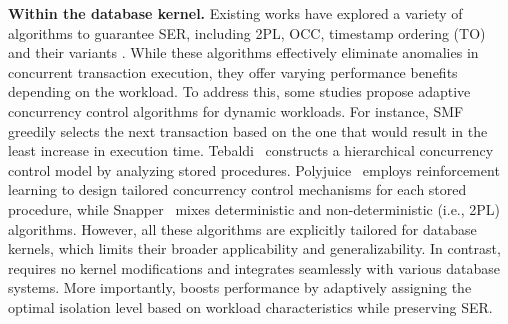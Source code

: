 \noindent\textbf{Within the database kernel.} 
Existing works have explored a variety of algorithms to guarantee SER, including 2PL, OCC, timestamp ordering (TO) and their variants \cite{DBLP:journals/pvldb/BarthelsMTAH19, DBLP:journals/csur/BernsteinG81, DBLP:conf/sosp/TuZKLM13,DBLP:conf/sigmod/YuPSD16,DBLP:conf/sigmod/KimWJP16,DBLP:conf/sigmod/LimKA17,DBLP:journals/pvldb/YuXPSRD18, DBLP:journals/tkde/ZhaoZZLLZPD23, DBLP:journals/vldb/WangJFP17, DBLP:journals/vldb/WangJFP18}. 
While these algorithms effectively eliminate anomalies in concurrent transaction execution, they offer varying performance benefits depending on the workload. To address this, some studies propose adaptive concurrency control algorithms for dynamic workloads.
For instance, SMF~\cite{DBLP:journals/pvldb/ChengKCSBCS24:SMF} greedily selects the next transaction based on the one that would result in the least increase in execution time. Tebaldi~\cite{DBLP:conf/sigmod/SuCDAX17:Tebaldi} constructs a hierarchical concurrency control model by analyzing stored procedures.  Polyjuice~\cite{DBLP:conf/osdi/WangDWCW0021:Polyjuice} employs reinforcement learning to design tailored concurrency control mechanisms for each stored procedure, while Snapper~\cite{DBLP:conf/sigmod/Liu00ZS22:Snapper} mixes deterministic and non-deterministic (i.e., 2PL) algorithms.
However, all these algorithms are explicitly tailored for database kernels, which limits their broader applicability and generalizability. In contrast, \sysname requires no kernel modifications and integrates seamlessly with various database systems. More importantly, \sysname boosts performance by adaptively assigning the optimal isolation level based on workload characteristics while preserving SER.


